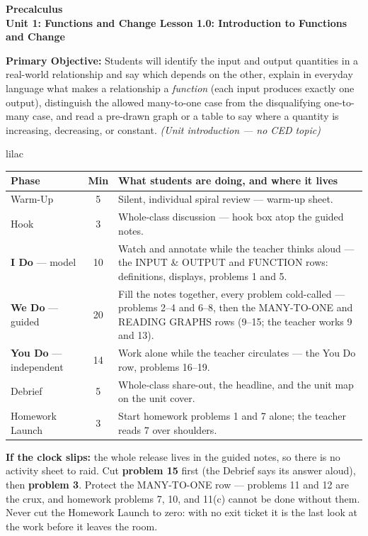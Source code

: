 \documentclass[10pt]{article}
\newcommand{\CourseName}{Precalculus}
\newcommand{\UnitNumberName}{Unit 1: Functions and Change \quad}
\newcommand{\LessonNumberName}{Lesson 1.0: Introduction to Functions and Change}
\begin{document}
\begin{center}
    {\Large\bfseries \CourseName \\
    {\small\bfseries \UnitNumberName \LessonNumberName}}
\end{center}

\begin{tcolorbox}[colback=lilac, colframe=plum, boxrule=0.9pt, arc=2mm,
    left=2mm, right=2mm, top=1.5mm, bottom=1.5mm]
    \textbf{Primary Objective:} Students will identify the input and output
    quantities in a real-world relationship and say which depends on the other,
    explain in everyday language what makes a relationship a \textit{function}
    (each input produces exactly one output), distinguish the allowed
    many-to-one case from the disqualifying one-to-many case, and read a
    pre-drawn graph or a table to say where a quantity is increasing,
    decreasing, or constant.
    \hfill\textit{\small (Unit introduction --- no CED topic)}
\end{tcolorbox}

\boxguard[22]
\begin{skillbox}{lilac}
\small
\renewcommand{\arraystretch}{1.25}
\begin{tabularx}{\linewidth}{@{} l c X @{}}
\textbf{Phase} & \textbf{Min} & \textbf{What students are doing, and where it lives} \\
\midrule
Warm-Up                       & 5  & Silent, individual spiral review --- warm-up sheet. \\
Hook                          & 3  & Whole-class discussion --- hook box atop the guided notes. \\
\textbf{I Do} --- model       & 10 & Watch and annotate while the teacher thinks aloud --- the INPUT \& OUTPUT and FUNCTION rows: definitions, displays, problems 1 and 5. \\
\textbf{We Do} --- guided     & 20 & Fill the notes together, every problem cold-called --- problems 2--4 and 6--8, then the MANY-TO-ONE and READING GRAPHS rows (9--15; the teacher works 9 and 13). \\
\textbf{You Do} --- independent & 14 & Work alone while the teacher circulates --- the You Do row, problems 16--19. \\
Debrief                       & 5  & Whole-class share-out, the headline, and the unit map on the unit cover. \\
Homework Launch               & 3  & Start homework problems 1 and 7 alone; the teacher reads 7 over shoulders. \\
\end{tabularx}

\smallskip
\textbf{If the clock slips:} the whole release lives in the guided notes, so there is
no activity sheet to raid. Cut \textbf{problem 15} first (the Debrief says its answer
aloud), then \textbf{problem 3}. Protect the MANY-TO-ONE row --- problems 11 and 12
are the crux, and homework problems 7, 10, and 11(c) cannot be done without them.
Never cut the Homework Launch to zero: with no exit ticket it is the last look at the
work before it leaves the room.
\end{skillbox}
\end{document}
